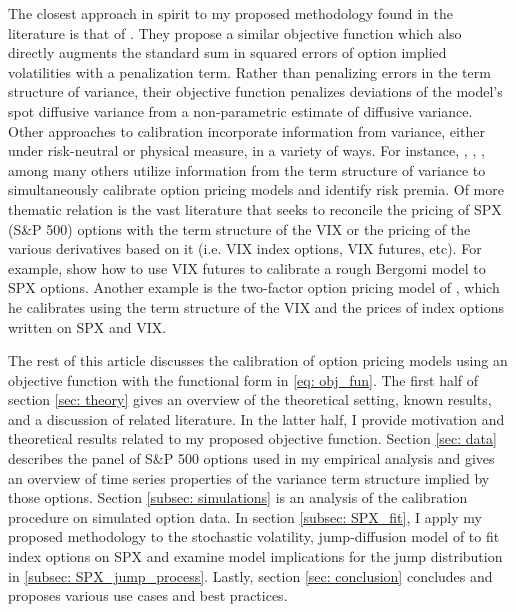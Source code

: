 \documentclass[12pt]{article}
\begin{document}
The closest approach in spirit to my proposed methodology found in the literature  is that of \cite{andersen2015parametric}. They propose a similar objective function which also directly augments the standard sum in squared errors of option implied volatilities with a penalization term. Rather than penalizing errors in the term structure of variance, their objective function penalizes deviations of the model's spot diffusive variance from a non-parametric estimate of diffusive variance. Other approaches to calibration incorporate information from variance, either under risk-neutral or physical measure, in a variety of ways. For instance, \cite{pan2002jump}, \cite{ait2002maximum}, \cite{ait2020term}, among many others utilize information from the term structure of variance to simultaneously calibrate option pricing models and identify risk premia.  Of more thematic relation is the vast literature that seeks to reconcile the pricing of SPX (S\&P 500) options with the term structure of the VIX or the pricing of the various derivatives based on it (i.e. VIX index options, VIX futures, etc). For example, \cite{jacquier2018vix} show how to use VIX futures to calibrate a rough Bergomi model to SPX options. Another example is the two-factor option pricing model of \cite{zhao2013unifying}, which he calibrates using the term structure of the VIX and the prices of index options written on SPX and VIX. 

The rest of this article discusses the calibration of option pricing models using an objective function with the functional form in \eqref{eq: obj_fun}. The first half of section \ref{sec: theory} gives an overview of the theoretical setting, known results, and a discussion of related literature. In the latter half, I provide motivation and theoretical results related to my proposed objective function. Section \ref{sec: data} describes the panel of S\&P 500 options used in my empirical analysis and gives an overview of time series properties of the variance term structure implied by those options. Section \ref{subsec: simulations} is an analysis of the calibration procedure on simulated option data. In section \ref{subsec: SPX_fit}, I apply my proposed methodology to the stochastic volatility, jump-diffusion model of \cite{bates1996jumps} to fit index options on SPX and examine model implications for the jump distribution in \eqref{subsec: SPX_jump_process}. Lastly, section \ref{sec: conclusion} concludes and proposes various use cases and best practices.
\end{document}
